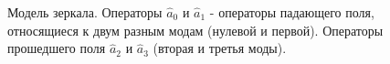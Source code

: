 \begin{figure}
\centering



\caption{Модель зеркала. Операторы $\hat{a}_0$ и 
$\hat{a}_1$ - операторы падающего поля, относящиеся к двум разным модам
(нулевой и первой). Операторы прошедшего поля $\hat{a}_2$ и 
$\hat{a}_3$ (вторая и третья моды).}
\label{figPart2Interfero_2}
\end{figure}
